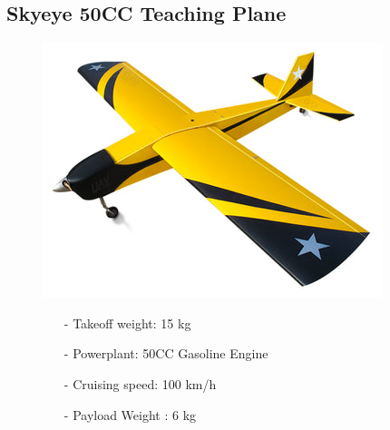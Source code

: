 \documentclass{article}
\begin{document}
\subsection{Skyeye 50CC Teaching Plane}
\begin{figure}[h]
    \begin{minipage}[b]{.45\linewidth}
        \centering
        \includegraphics[width=0.7\linewidth]{Aircraft pics/. SKYEYE 50CC.png}
    \end{minipage}\hfill
    \begin{minipage}[b]{0.45\linewidth}
        \begin{itemize}
            \item [-] Takeoff weight: 15 kg
            \item [-] Powerplant: 50CC Gasoline Engine
            \item [-] Cruising speed: 100 km/h 
            \item [-] Payload Weight : 6 kg
        \end{itemize}
    \end{minipage}
\end{figure}

\vspace{\fill}
\end{document}
